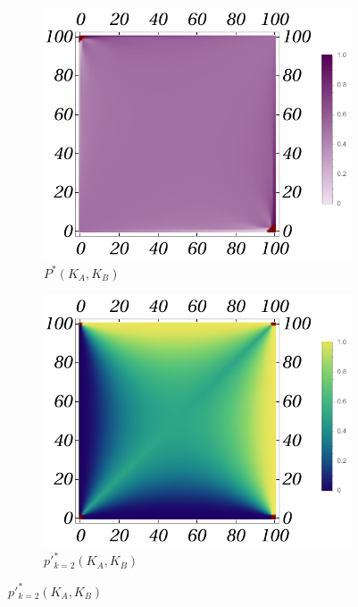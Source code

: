 \documentclass{article}
\theoremstyle{definition}
\begin{document}
\begin{figure}[H]
    \centering
    \begin{subfigure}[b]{0.3\textwidth}
        \includegraphics[width=\textwidth]{img/PB_Plot_4_100.pdf}
        \caption{$P^*(K_A,K_B)$}
        \label{fig:BGame4__100_P}
    \end{subfigure}
    \hfill %
    \begin{subfigure}[b]{0.3\textwidth}
        \includegraphics[width=\textwidth]{img/ppkB_Plot_4_100.pdf}
        \caption{$p'^*_{k=2}(K_A,K_B)$}
        \label{fig:BGame4__100_ppk_2}

\end{subfigure}
\end{figure}
\end{document}
